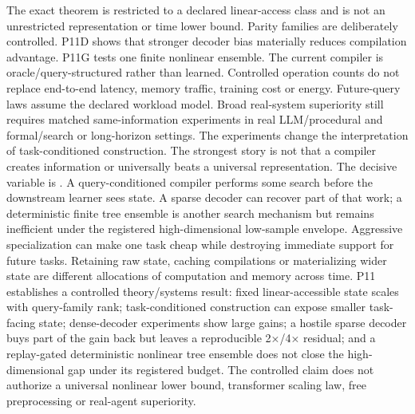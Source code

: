\markdownRendererDocumentBegin
\markdownRendererSectionBegin
{}\markdownRendererInterblockSeparator
{}The exact theorem is restricted to a declared linear-access class and is not an unrestricted representation or time lower bound. Parity families are deliberately controlled. P11D shows that stronger decoder bias materially reduces compilation advantage. P11G tests one finite nonlinear ensemble. The current compiler is oracle/query-structured rather than learned. Controlled operation counts do not replace end-to-end latency, memory traffic, training cost or energy. Future-query laws assume the declared workload model. Broad real-system superiority still requires matched same-information experiments in real LLM/procedural and formal/search or long-horizon settings.\markdownRendererInterblockSeparator
{}The experiments change the interpretation of task-conditioned construction. The strongest story is not that a compiler creates information or universally beats a universal representation. The decisive variable is . A query-conditioned compiler performs some search before the downstream learner sees state. A sparse decoder can recover part of that work; a deterministic finite tree ensemble is another search mechanism but remains inefficient under the registered high-dimensional low-sample envelope.\markdownRendererInterblockSeparator
{}Aggressive specialization can make one task cheap while destroying immediate support for future tasks. Retaining raw state, caching compilations or materializing wider state are different allocations of computation and memory across time.\markdownRendererInterblockSeparator
{}P11 establishes a controlled theory/systems result: fixed linear-accessible state scales with query-family rank; task-conditioned construction can expose smaller task-facing state; dense-decoder experiments show large gains; a hostile sparse decoder buys part of the gain back but leaves a reproducible 2×/4× residual; and a replay-gated deterministic nonlinear tree ensemble does not close the high-dimensional gap under its registered budget.\markdownRendererInterblockSeparator
{}\markdownRendererBlockQuoteBegin
{}
\markdownRendererBlockQuoteEnd \markdownRendererInterblockSeparator
{}The controlled claim does not authorize a universal nonlinear lower bound, transformer scaling law, free preprocessing or real-agent superiority.
\markdownRendererSectionEnd \markdownRendererDocumentEnd